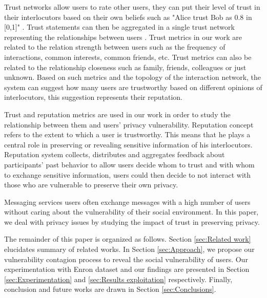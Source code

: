 Trust networks allow users to rate other users,
	they can put their level of trust in their interlocutors based on their own beliefs such as "Alice trust Bob as 0.8 in [0,1]" \cite{massa_trustaware_2007}.
Trust statements can then be aggregated in a single trust network representing the relationships between users \cite{massa_trustaware_2007}.
Trust metrics in our work are related to the relation strength between users such as the frequency of interactions,
	common interests,
	common friends, etc.
Trust metrics can also be related to the relationship closeness such as family,
	friends,
	colleagues or just unknown.
Based on such metrics and the topology of the interaction network,
	the system can suggest how many users are trustworthy based on different opinions of interlocutors,
	this suggestion represents their reputation.

Trust and reputation metrics are used in our work in order to study the relationship between them and users' privacy vulnerability.
Reputation concept refers to the extent to which a user is trustworthy.
This means that he plays a central role in preserving or revealing sensitive information of his interlocutors.
Reputation system collects,
	distributes and aggregates feedback about participants’ past behavior to allow users decide whom to trust and with whom to exchange sensitive information,
	users could then decide to not interact with those who are vulnerable to preserve their own privacy.

Messaging services users often exchange messages with a high number of users without caring about the vulnerability of their social environment.
In this paper,
	we deal with privacy issues by studying the impact of trust in preserving privacy.

The remainder of this paper is organized as follows.
Section \ref{sec:Related work} elucidates summary of related works.
In Section \ref{sec:Approach},
	we propose our vulnerability contagion process to reveal the social vulnerability of users.
Our experimentation with Enron dataset and our findings are presented in Section \ref{sec:Experimentation} and \ref{sec:Results exploitation} respectively.
Finally,
	conclusion and future works are drawn in Section \ref{sec:Conclusions}.


